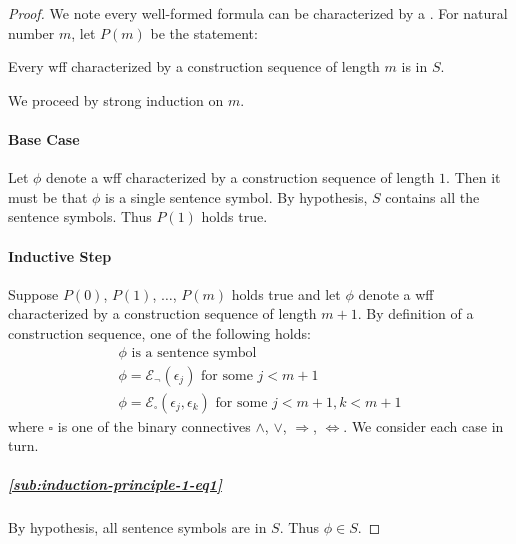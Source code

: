 \documentclass{report}
\begin{document}
  \begin{proof}
    We note every well-formed formula can be characterized by a
      .
    For natural number $m$, let $P(m)$ be the statement:
      \begin{induction}
        Every wff characterized by a construction sequence of length $m$ is in
          $S$.
      \end{induction}
    \noindent
    We proceed by strong induction on $m$.

    \paragraph{Base Case}%

      Let $\phi$ denote a wff characterized by a construction sequence of length
        $1$.
      Then it must be that $\phi$ is a single sentence symbol.
      By hypothesis, $S$ contains all the sentence symbols.
      Thus $P(1)$ holds true.

    \paragraph{Inductive Step}%

      Suppose $P(0)$, $P(1)$, $\ldots$, $P(m)$ holds true and let $\phi$ denote
        a wff characterized by a construction sequence of length $m + 1$.
      By definition of a construction sequence, one of the following holds:
        \begin{align}
          & \phi \text{ is a sentence symbol}
            & \label{sub:induction-principle-1-eq1} \\
          & \phi = \mathcal{E}_\neg(\epsilon_j)
            \text{ for some } j < m + 1
            & \label{sub:induction-principle-1-eq2} \\
          & \phi = \mathcal{E}_\square(\epsilon_j, \epsilon_k)
            \text{ for some } j < m + 1, k < m + 1
            & \label{sub:induction-principle-1-eq3}
        \end{align}
        where $\square$ is one of the binary connectives $\land$, $\lor$,
          $\Rightarrow$, $\Leftrightarrow$.
      We consider each case in turn.

      \subparagraph{\eqref{sub:induction-principle-1-eq1}}%

        By hypothesis, all sentence symbols are in $S$.
        Thus $\phi \in S$.


\end{proof}
\end{document}
